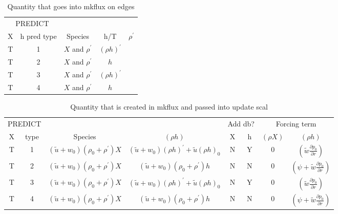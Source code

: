 \documentclass[11pt]{article}
\def\ut    {\tilde{u}}
\begin{document}
\begin{table*}
\begin{center}
\caption{Quantity that goes into mkflux on edges \newline}
\begin{tabular}{|c|c|c|c|c|}
\multicolumn{2}{c}{PREDICT} & \multicolumn{1}{c}{} & \multicolumn{1}{c}{} \\
\multicolumn{1}{c}{X} & \multicolumn{1}{c}{h pred type} & \multicolumn{1}{c}{Species } & \multicolumn{1}{c}{h/T } & \multicolumn{1}{c}{$\rho^\prime$} \\
\hline
T & 1 & $X$ and $\rho^\prime$ & $(\rho h)^\prime$ & \\
T & 2 & $X$ and $\rho^\prime$ & $h$ & \\
T & 3 & $X$ and $\rho^\prime$ & $(\rho h)^\prime$ & \\
T & 4 & $X$ and $\rho^\prime$ & $h$ & \\
\hline
\end{tabular}
\end{center}
\end{table*}

\begin{table*}
\begin{center}
\caption{Quantity that is created in mkflux and passed into update scal\newline}
\begin{tabular}{|c|c|c|c|c|c|c|c|}
\multicolumn{2}{c}{PREDICT}   & 
\multicolumn{1}{c}{} & \multicolumn{1}{c}{}  
& \multicolumn{2}{c}{Add db?} & \multicolumn{2}{c}{Forcing term }\\
\multicolumn{1}{c}{X}   & \multicolumn{1}{c}{type} &
\multicolumn{1}{c}{Species } & \multicolumn{1}{c}{$(\rho h)$} 
& \multicolumn{1}{c}{X} & \multicolumn{1}{c}{h} & \multicolumn{1}{c}{$(\rho X)$} & \multicolumn{1}{c}{$(\rho h)$} \\
\hline
T & 1 & $(\ut+w_0)(\rho_0+\rho^\prime) X          $ & $(\ut+w_0)(\rho h)^\prime + \ut (\rho h)_0$ & N & Y & 0 & $ (\tilde{w} \frac{\partial p_0}{\partial r}) $ \\
T & 2 & $(\ut+w_0)(\rho_0+\rho^\prime) X          $ & $(\ut+w_0) (\rho_0+\rho^\prime) h$ & N & N & 0 & $ (\psi + \tilde{w} \frac{\partial p_0}{\partial r}) $ \\
T & 3 & $(\ut+w_0)(\rho_0+\rho^\prime) X          $ & $(\ut+w_0)(\rho h)^\prime + \ut (\rho h)_0$ & N & Y & 0 & $ (\tilde{w} \frac{\partial p_0}{\partial r}) $ \\
T & 4 & $(\ut+w_0)(\rho_0+\rho^\prime) X          $ & $(\ut+w_0) (\rho_0+\rho^\prime) h$ & N & N & 0 & $ (\psi + \tilde{w} \frac{\partial p_0}{\partial r}) $ \\
\hline
\end{tabular}
\end{center}
\end{table*}
\end{document}
